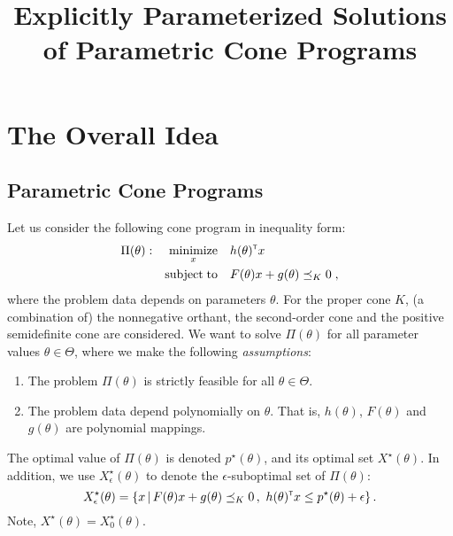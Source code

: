 \documentclass{article}
\renewcommand{\t}{^{\mbox{\tiny \sf T}}}
\DeclareMathOperator*{\minimize}{minimize}
\DeclareMathOperator*{\subj}{subject\;to}
\begin{document}
\title{Explicitly Parameterized Solutions of Parametric Cone Programs}

\maketitle



\section{The Overall Idea}\label{sec:overall_approach}


\subsection{Parametric Cone Programs}\label{subsec:parametric_program}

Let us consider the following cone program in inequality form:
\begin{gather}\label{eq:parametric_primal}
\begin{aligned}
\Pi(\theta): && \minimize_{x} &&& h(\theta)\t x\\
             && \subj         &&& F(\theta)x+g(\theta)\preceq_K 0 \;,
\end{aligned}
\end{gather}
where the problem data depends on parameters $\theta$. For the proper cone $K$, (a combination of) the nonnegative orthant, the second-order cone and the positive semidefinite cone are considered. We want to solve $\Pi(\theta)$ for all parameter values $\theta\in\Theta$, where we make the following \textit{assumptions}:
\begin{enumerate}[\it\text{A}1.]
\item The problem $\Pi(\theta)$ is strictly feasible for all $\theta\in\Theta$.
\item The problem data depend polynomially on $\theta$. That is, $h(\theta)$, $F(\theta)$ and $g(\theta)$ are polynomial mappings.
\end{enumerate}
The optimal value of $\Pi(\theta)$ is denoted $p^\star(\theta)$, and its optimal set $X^\star(\theta)$. In addition, we use $X^\star_\epsilon(\theta)$ to denote the $\epsilon$-suboptimal set of $\Pi(\theta)$:
\[ X^\star_\epsilon(\theta) = \{x \,|\, F(\theta)x+g(\theta)\preceq_K 0 \,,~ h(\theta)\t x \leq p^\star(\theta)+\epsilon\} \,.%
\]
Note, $X^\star(\theta)=X^\star_0(\theta)$.
\end{document}
